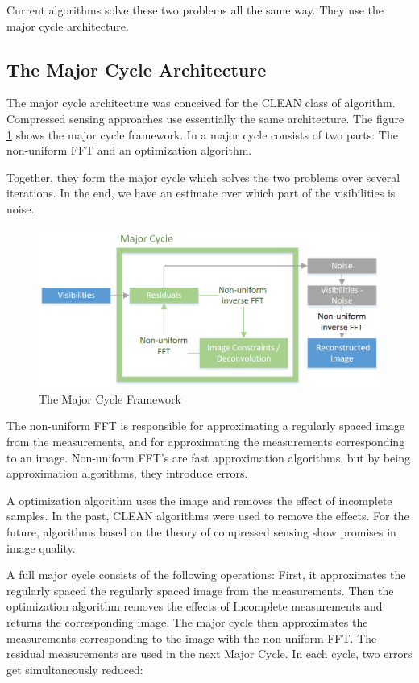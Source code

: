 Current algorithms solve these two problems all the same way. They use the major cycle architecture.


\subsection{The Major Cycle Architecture}
The major cycle architecture was conceived for the CLEAN class of algorithm. Compressed sensing approaches use essentially the same architecture. The figure \ref{intro:major} shows the major cycle framework. In a major cycle consists of two parts: The non-uniform FFT and an optimization algorithm.

Together, they form the major cycle which solves the two problems over several iterations. In the end, we have an estimate over which part of the visibilities is noise.

\begin{figure}
	\centering
	\vspace{-10pt}
	\includegraphics[width=1.0\linewidth]{./chapters/01.intro/Major-Minor.png}
	\caption{The Major Cycle Framework}
	\label{intro:major}
	\vspace{-10pt}
\end{figure}

The non-uniform FFT is responsible for approximating a regularly spaced image from the measurements, and for approximating the measurements corresponding to an image. Non-uniform FFT's are fast approximation algorithms, but by being approximation algorithms, they introduce errors. 

A optimization algorithm uses the image and removes the effect of incomplete samples. In the past, CLEAN algorithms were used to remove the effects. For the future, algorithms based on the theory of compressed sensing show promises in image quality.

A full major cycle consists of the following operations: First, it approximates the regularly spaced the regularly spaced image from the measurements. Then the optimization algorithm removes the effects of Incomplete measurements and returns the corresponding image. The major cycle then approximates the measurements corresponding to the image with the non-uniform FFT. The residual measurements are used in the next Major Cycle. In each cycle, two errors get simultaneously reduced:

